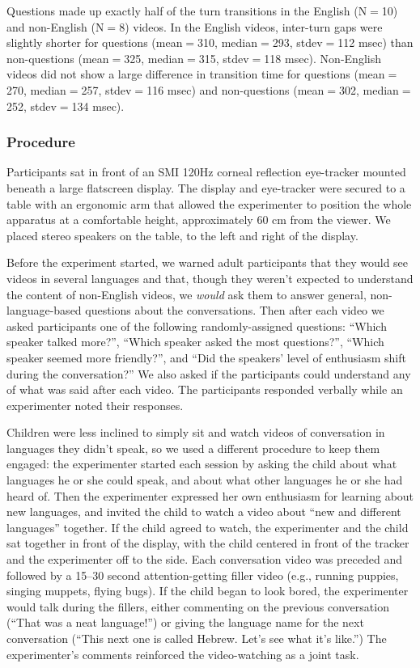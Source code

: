 \documentclass[authoryear, 12pt]{elsarticle}
\begin{document}
Questions made up exactly half of the turn transitions in the English (N$=$10) and non-English (N$=$8) videos. In the English videos, inter-turn gaps were slightly shorter for questions (mean$=$310, median$=$293, stdev$=$112 msec) than non-questions (mean$=$325, median$=$315, stdev$=$118 msec). Non-English videos did not show a large difference in transition time for questions (mean$=$270, median$=$257, stdev$=$116 msec) and non-questions (mean$=$302, median$=$252, stdev$=$134 msec).

\subsubsection*{Procedure} 
Participants sat in front of an SMI 120Hz corneal reflection eye-tracker mounted beneath a large flatscreen display. The display and eye-tracker were secured to a table with an ergonomic arm that allowed the experimenter to position the whole apparatus at a comfortable height, approximately 60 cm from the viewer. We placed stereo speakers on the table, to the left and right of the display. 

Before the experiment started, we warned adult participants that they would see videos in several languages and that, though they weren't expected to understand the content of non-English videos, we \textit{would} ask them to answer general, non-language-based questions about the conversations. Then after each video we asked participants one of the following randomly-assigned questions: ``Which speaker talked more?'', ``Which speaker asked the most questions?'', ``Which speaker seemed more friendly?'', and ``Did the speakers' level of enthusiasm shift during the conversation?'' We also asked if the participants could understand any of what was said after each video. The participants responded verbally while an experimenter noted their responses.

Children were less inclined to simply sit and watch videos of conversation in languages they didn't speak, so we used a different procedure to keep them engaged: the experimenter started each session by asking the child about what languages he or she could speak, and about what other languages he or she had heard of. Then the experimenter expressed her own enthusiasm for learning about new languages, and invited the child to watch a video about ``new and different languages'' together. If the child agreed to watch, the experimenter and the child sat together in front of the display, with the child centered in front of the tracker and the experimenter off to the side. Each conversation video was preceded and followed by a 15--30 second attention-getting filler video (e.g., running puppies, singing muppets, flying bugs). If the child began to look bored, the experimenter would talk during the fillers, either commenting on the previous conversation (``That was a neat language!'') or giving the language name for the next conversation (``This next one is called Hebrew. Let's see what it's like.'') The experimenter's comments reinforced the video-watching as a joint task.
\end{document}
